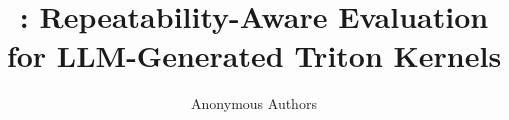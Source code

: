 \documentclass[10pt]{article}
\title{\okf: Repeatability-Aware Evaluation for LLM-Generated Triton Kernels}
\author{Anonymous Authors}
\date{}
\begin{document}
\maketitle
\begin{abstract}

\end{abstract}









\FloatBarrier



\FloatBarrier
\clearpage
\appendix

\end{document}
